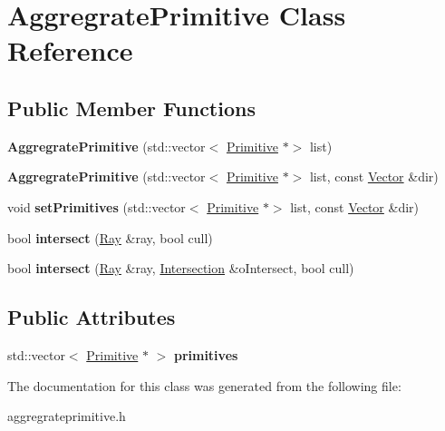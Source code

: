 \hypertarget{class_aggregrate_primitive}{}\section{Aggregrate\+Primitive Class Reference}
\label{class_aggregrate_primitive}
\subsection*{Public Member Functions}
\begin{DoxyCompactItemize}
\item 
\mbox{\label{class_aggregrate_primitive_ab28cefcbcc95be4c18c05de2b8412b68}} 
{\bfseries Aggregrate\+Primitive} (std\+::vector$<$ \mbox{\hyperlink{class_primitive}{Primitive}} $\ast$$>$ list)
\item 
\mbox{\label{class_aggregrate_primitive_a866e464ae8dbe6e62cb45a7a0ca00c66}} 
{\bfseries Aggregrate\+Primitive} (std\+::vector$<$ \mbox{\hyperlink{class_primitive}{Primitive}} $\ast$$>$ list, const \mbox{\hyperlink{struct_vector}{Vector}} \&dir)
\item 
\mbox{\label{class_aggregrate_primitive_a785c7f8bc0566c246f4d7f374646485f}} 
void {\bfseries set\+Primitives} (std\+::vector$<$ \mbox{\hyperlink{class_primitive}{Primitive}} $\ast$$>$ list, const \mbox{\hyperlink{struct_vector}{Vector}} \&dir)
\item 
\mbox{\label{class_aggregrate_primitive_ae5b48bccecf4a2f7e56d1f7e6cf82a9b}} 
bool {\bfseries intersect} (\mbox{\hyperlink{class_ray}{Ray}} \&ray, bool cull)
\item 
\mbox{\label{class_aggregrate_primitive_a1887f54b75a0dfc40851230565c351af}} 
bool {\bfseries intersect} (\mbox{\hyperlink{class_ray}{Ray}} \&ray, \mbox{\hyperlink{class_intersection}{Intersection}} \&o\+Intersect, bool cull)
\end{DoxyCompactItemize}
\subsection*{Public Attributes}
\begin{DoxyCompactItemize}
\item 
\mbox{\label{class_aggregrate_primitive_a5bc0383ff5720d2dfa36f20a7a1f5398}} 
std\+::vector$<$ \mbox{\hyperlink{class_primitive}{Primitive}} $\ast$ $>$ {\bfseries primitives}
\end{DoxyCompactItemize}


The documentation for this class was generated from the following file\+:\begin{DoxyCompactItemize}
\item 
aggregrateprimitive.\+h\end{DoxyCompactItemize}
